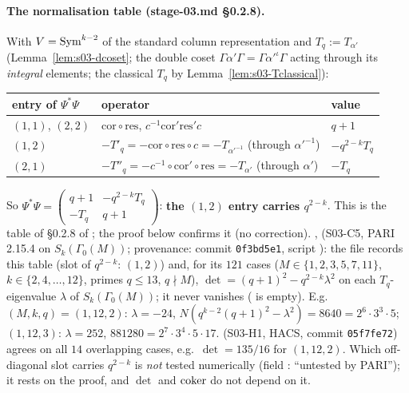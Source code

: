 \paragraph{The normalisation table (stage-03.md \S0.2.8).} With $V=\mathrm{Sym}^{k-2}$ of the standard column representation and
$T_q:=T_{\alpha'}$ (Lemma~\ref{lem:s03-dcoset}; the double coset $\Gamma\alpha'\Gamma=\Gamma\alpha'^\iota\Gamma$ acting through its \emph{integral} elements; the classical
$T_q$ by Lemma~\ref{lem:s03-Tclassical}):
\begin{center}\small
\begin{tabular}{lll}\toprule
entry of $\Psi^*\Psi$ & operator & value\\\midrule
$(1,1)$, $(2,2)$ & $\mathrm{cor}\circ\mathrm{res}$, $c^{-1}\mathrm{cor}'\mathrm{res}'c$ & $q+1$\\
$(1,2)$ & $-T'_q=-\mathrm{cor}\circ\mathrm{res}\circ c=-T_{\alpha'^{-1}}$ (through $\alpha'^{-1}$) & $-q^{2-k}T_q$\\
$(2,1)$ & $-T''_q=-c^{-1}\circ\mathrm{cor}'\circ\mathrm{res}=-T_{\alpha'}$ (through $\alpha'$) & $-T_q$\\\bottomrule
\end{tabular}
\end{center}
So $\Psi^*\Psi=\left(\begin{smallmatrix}q+1&-q^{2-k}T_q\\-T_q&q+1\end{smallmatrix}\right)$: \textbf{the $(1,2)$ entry carries $q^{2-k}$}. This is the table of
\S0.2.8 of ; the proof below confirms it (no correction).
\stcomp{},  (S03-C5, PARI 2.15.4 on $S_k(\Gamma_0(M))$; provenance: commit \texttt{0f3bd5e1}, script
): the file records this table (slot of $q^{2-k}$: $(1,2)$) and, for its $121$ cases ($M\in\{1,2,3,5,7,11\}$,
$k\in\{2,4,\dots,12\}$, primes $q\le13$, $q\nmid M$), $\det=(q+1)^2-q^{2-k}\lambda^2$ on each $T_q$-eigenvalue $\lambda$ of $S_k(\Gamma_0(M))$; it never vanishes
( is empty). E.g.\ $(M,k,q)=(1,12,2)$: $\lambda=-24$, $N(q^{k-2}(q+1)^2-\lambda^2)=8640=2^6\cdot3^3\cdot5$; $(1,12,3)$: $\lambda=252$,
$881280=2^7\cdot3^4\cdot5\cdot17$.  (S03-H1, HACS, commit \texttt{05f7fe72}) agrees on all $14$ overlapping cases, e.g.\
$\det=135/16$ for $(1,12,2)$. Which off-diagonal slot carries $q^{2-k}$ is \emph{not} tested numerically (field : ``untested by
PARI''); it rests on the proof, and $\det$ and $\operatorname{coker}$ do not depend on it.

